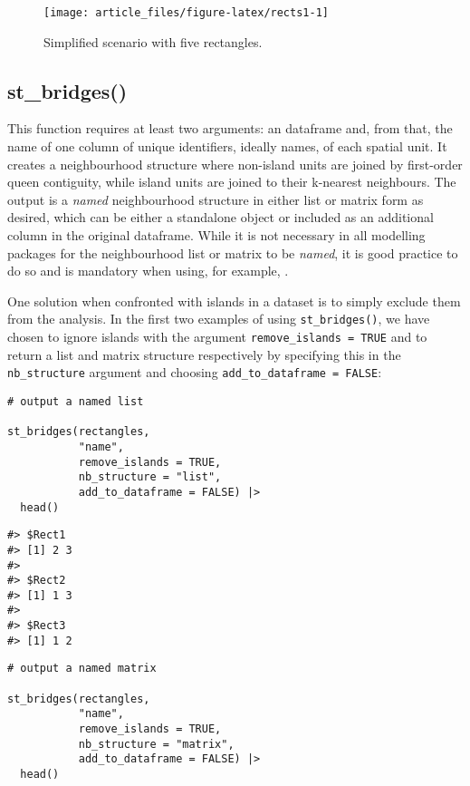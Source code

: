 \begin{figure}

{\centering \texttt{[image: article\_files/figure-latex/rects1-1]} 

}

\caption{Simplified scenario with five rectangles. }\label{fig:rects1}
\end{figure}

\hypertarget{st_bridges}{%
\subsection{st\_bridges()}\label{st_bridges}}

This function requires at least two arguments: an  dataframe and, from that, the name of one column of unique identifiers, ideally names, of each spatial unit. It creates a neighbourhood structure where non-island units are joined by first-order queen contiguity, while island units are joined to their k-nearest neighbours. The output is a \emph{named} neighbourhood structure in either list or matrix form as desired, which can be either a standalone object or included as an additional column in the original  dataframe. While it is not necessary in all modelling packages for the neighbourhood list or matrix to be \emph{named}, it is good practice to do so and is mandatory when using, for example, .

One solution when confronted with islands in a dataset is to simply exclude them from the analysis. In the first two examples of using \texttt{st\_bridges()}, we have chosen to ignore islands with the argument \texttt{remove\_islands\ =\ TRUE} and to return a list and matrix structure respectively by specifying this in the \texttt{nb\_structure} argument and choosing \texttt{add\_to\_dataframe\ =\ FALSE}:

\begin{verbatim}
# output a named list

st_bridges(rectangles, 
           "name", 
           remove_islands = TRUE, 
           nb_structure = "list", 
           add_to_dataframe = FALSE) |>
  head()
\end{verbatim}

\begin{verbatim}
#> $Rect1
#> [1] 2 3
#> 
#> $Rect2
#> [1] 1 3
#> 
#> $Rect3
#> [1] 1 2
\end{verbatim}

\begin{verbatim}
# output a named matrix

st_bridges(rectangles, 
           "name", 
           remove_islands = TRUE, 
           nb_structure = "matrix", 
           add_to_dataframe = FALSE) |> 
  head()
\end{verbatim}

